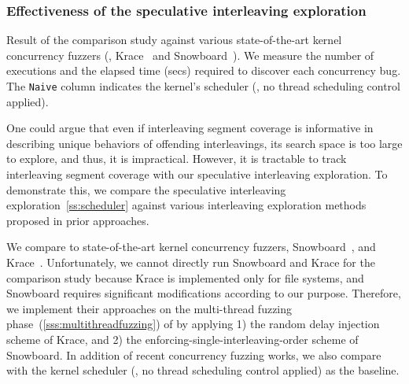 %




%






\subsubsection{Effectiveness of the speculative interleaving
  exploration}
\label{sss:interleavingsearch}
%
%
\begin{table}
  \centering
  
  \caption{Result of the comparison study against various
    state-of-the-art kernel concurrency fuzzers (\ie,
    Krace~\cite{krace} and Snowboard~\cite{snowboard}). We measure the
    number of executions and the elapsed time (secs) required to
    discover each concurrency bug. The \texttt{Naive} column indicates
    the kernel's scheduler (\ie, no thread scheduling control applied).}
  \label{table:comparison-interleaving-search}
\end{table}
%
One could argue that even if interleaving segment coverage is
informative in describing unique behaviors of offending interleavings,
its search space is too large to explore, and thus, it is impractical.
%
However, it is tractable to track interleaving segment coverage with
our speculative interleaving exploration. To demonstrate this, we
compare the speculative interleaving
exploration~\autoref{ss:scheduler} against various interleaving
exploration methods proposed in prior approaches.

%
We compare \sys to state-of-the-art kernel concurrency fuzzers,
Snowboard~\cite{snowboard}, and Krace~\cite{krace}.
%
Unfortunately, we cannot directly run Snowboard and Krace for the
comparison study because Krace is implemented only for file systems,
and Snowboard requires significant modifications according to our
purpose\dr{}.
%
Therefore, we implement their approaches on the multi-thread fuzzing
phase~(\autoref{sss:multithreadfuzzing}) of \sys by applying 1) the
random delay injection scheme of Krace, and 2) the
enforcing-single-interleaving-order scheme of Snowboard.
%
In addition of recent concurrency fuzzing works, we also compare with
the kernel scheduler (\ie, no thread scheduling control applied) as
the baseline.




